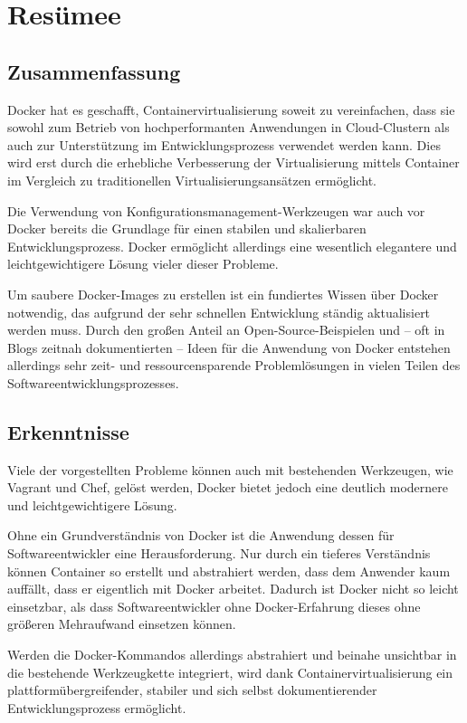 \chapter{Resümee}
\section{Zusammenfassung}
Docker hat es geschafft, Containervirtualisierung soweit zu vereinfachen, dass sie sowohl zum Betrieb von hochperformanten Anwendungen in Cloud-Clustern als auch zur Unterstützung im Entwicklungsprozess verwendet werden kann.
Dies wird erst durch die erhebliche Verbesserung der Virtualisierung mittels Container im Vergleich zu traditionellen Virtualisierungsansätzen ermöglicht.

Die Verwendung von Konfigurationsmanagement-Werkzeugen war auch vor Docker bereits die Grundlage für einen stabilen und skalierbaren Entwicklungsprozess.
Docker ermöglicht allerdings eine wesentlich elegantere und leichtgewichtigere Lösung vieler dieser Probleme.

Um saubere Docker-Images zu erstellen ist ein fundiertes Wissen über Docker notwendig, das aufgrund der sehr schnellen Entwicklung ständig aktualisiert werden muss.
Durch den großen Anteil an Open-Source-Beispielen und -- oft in Blogs zeitnah dokumentierten -- Ideen für die Anwendung von Docker entstehen allerdings sehr zeit- und ressourcensparende Problemlösungen in vielen Teilen des Softwareentwicklungsprozesses.

\section{Erkenntnisse}
Viele der vorgestellten Probleme können auch mit bestehenden Werkzeugen, wie \zB Vagrant und Chef, gelöst werden, Docker bietet jedoch eine deutlich modernere und leichtgewichtigere Lösung.

Ohne ein Grundverständnis von Docker ist die Anwendung dessen für Softwareentwickler eine Herausforderung.
Nur durch ein tieferes Verständnis können Container so erstellt und abstrahiert werden, dass dem Anwender kaum auffällt, dass er eigentlich mit Docker arbeitet.
Dadurch ist Docker nicht so leicht einsetzbar, als dass Softwareentwickler ohne Docker-Erfahrung dieses ohne größeren Mehraufwand einsetzen können.

Werden die Docker-Kommandos allerdings abstrahiert und beinahe unsichtbar in die bestehende Werkzeugkette integriert, wird dank Containervirtualisierung ein plattformübergreifender, stabiler und sich selbst dokumentierender Entwicklungsprozess ermöglicht.


